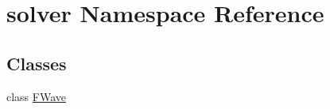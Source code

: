\hypertarget{namespacesolver}{}\section{solver Namespace Reference}
\label{namespacesolver}
\subsection*{Classes}
\begin{DoxyCompactItemize}
\item 
class \hyperlink{classsolver_1_1FWave}{F\+Wave}
\end{DoxyCompactItemize}
